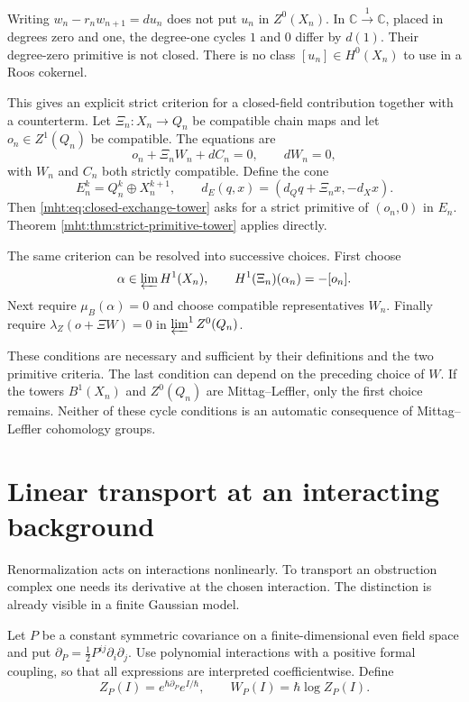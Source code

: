 Writing $w_n-r_nw_{n+1}=du_n$ does not put $u_n$ in $Z^0(X_n)$.
In $\mathbb C\xrightarrow{1}\mathbb C$, placed in degrees zero
and one, the degree-one cycles $1$ and $0$ differ by $d(1)$.
Their degree-zero primitive is not closed.
There is no class $[u_n]\in H^0(X_n)$ to use in a Roos cokernel.

This gives an explicit strict criterion for a closed-field
contribution together with a counterterm. Let
$\Xi_n:X_n\to Q_n$ be compatible chain maps and let
$o_n\in Z^1(Q_n)$ be compatible. The equations are
\begin{equation}\label{mht:eq:closed-exchange-tower}
 o_n+\Xi_n W_n+dC_n=0,\qquad dW_n=0,
\end{equation}
with $W_n$ and $C_n$ both strictly compatible.
Define the cone
\[
 E_n^k=Q_n^k\oplus X_n^{k+1},\qquad
 d_E(q,x)=(d_Qq+\Xi_nx,-d_Xx).
\]
Then \eqref{mht:eq:closed-exchange-tower} asks for a strict
primitive of $(o_n,0)$ in $E_n$. Theorem
\ref{mht:thm:strict-primitive-tower} applies directly.

The same criterion can be resolved into successive choices.
First choose
\[
 \alpha\in\varprojlim H^1(X_n),\qquad
 H^1(\Xi_n)(\alpha_n)=-[o_n].
\]
Next require $\mu_B(\alpha)=0$ and choose compatible representatives
$W_n$. Finally require
$\lambda_Z(o+\Xi W)=0$ in $\varprojlim^1 Z^0(Q_n)$.

These conditions are necessary and sufficient by their definitions
and the two primitive criteria. The last condition can depend on
the preceding choice of $W$. If the towers $B^1(X_n)$ and
$Z^0(Q_n)$ are Mittag--Leffler, only the first choice remains.
Neither of these cycle conditions is an automatic consequence of
Mittag--Leffler cohomology groups.

\section{Linear transport at an interacting background}

Renormalization acts on interactions nonlinearly. To transport an
obstruction complex one needs its derivative at the chosen
interaction. The distinction is already visible in a finite
Gaussian model.

Let $P$ be a constant symmetric covariance on a finite-dimensional
even field space and put
$\partial_P=\frac12P^{ij}\partial_i\partial_j$.
Use polynomial interactions with a positive formal coupling, so
that all expressions are interpreted coefficientwise. Define
\[
 Z_P(I)=e^{\hbar\partial_P}e^{I/\hbar},\qquad
 W_P(I)=\hbar\log Z_P(I).
\]

